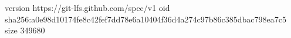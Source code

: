 version https://git-lfs.github.com/spec/v1
oid sha256:a0e98d10174fe8c42fef7dd78e6a10404f36d4a274c97b86c385dbac798ea7c5
size 349680
